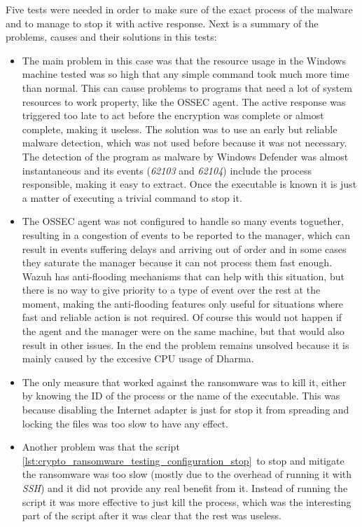 \linej
Five tests were needed in order to make sure of the exact process of the malware and to manage to stop it with active response.
Next is a summary of the problems, causes and their solutions in this tests:
\begin{itemize}
	\item The main problem in this case was that the resource usage in the Windows machine tested was so high that any simple command took much more time than normal.
This can cause problems to programs that need a lot of system resources to work property, like the OSSEC agent.
The active response was triggered too late to act before the encryption was complete or almost complete, making it useless.
\linej
The solution was to use an early but reliable malware detection, which was not used before because it was not necessary.
The detection of the program as malware by Windows Defender was almost instantaneous and its events (\textit{62103} and \textit{62104}) include the process responsible, making it easy to extract.
Once the executable is known it is just a matter of executing a trivial command to stop it.

	\item The OSSEC agent was not configured to handle so many events toguether, resulting in a congestion of events to be reported to the manager, which can result in events suffering delays and arriving out of order and in some cases they saturate the manager because it can not process them fast enough.
\linej
Wazuh has anti-flooding mechanisms\cite{antiflooding} that can help with this situation, but there is no way to give priority to a type of event over the rest at the moment, making the anti-flooding features only useful for situations where fast and reliable action is not required.
Of course this would not happen if the agent and the manager were on the same machine, but that would also result in other issues.
In the end the problem remains unsolved because it is mainly caused by the excesive CPU usage of Dharma.

	\item The only measure that worked against the ransomware was to kill it, either by knowing the ID of the process or the name of the executable.
This was because disabling the Internet adapter is just for stop it from spreading and locking the files was too slow to have any effect.

	\item Another problem was that the script \ref{lst:crypto_ransomware_testing_configuration_stop}\ to stop and mitigate the ransomware was too slow (mostly due to the overhead of running it with \textit{SSH}) and it did not provide any real benefit from it.
\linej
Instead of running the script it was more effective to just kill the process, which was the interesting part of the script after it was clear that the rest was useless.
\end{itemize}
